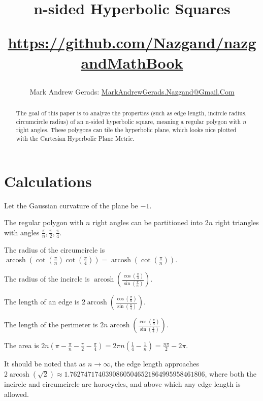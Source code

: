 \documentclass[]{article}
\author{Mark Andrew Gerads: \href{MailTo:MarkAndrewGerads.Nazgand@Gmail.Com}{MarkAndrewGerads.Nazgand@Gmail.Com}}
\title{
	n-sided Hyperbolic Squares
	
	\href{https://github.com/Nazgand/nazgandMathBook}{https://github.com/Nazgand/nazgandMathBook}
}
\DeclareMathOperator{\arcosh}{arcosh}
\newcommand{\pqty}[1]{{\left(#1\right)}}
\numberwithin{equation}{section}
\begin{document}
	
	\maketitle
	
	\begin{abstract}
		The goal of this paper is to analyze the properties (such as edge length, incircle radius, circumcircle radius) of an n-sided hyperbolic square, meaning a regular polygon with $n$ right angles. These polygons can tile the hyperbolic plane, which looks nice plotted with the Cartesian Hyperbolic Plane Metric.
	\end{abstract}
	
	\section{Calculations}
	Let the Gaussian curvature of the plane be $-1$.
	
	The regular polygon with $n$ right angles can be partitioned into $2n$ right triangles with angles $\frac{\pi}{n},\frac{\pi}{2},\frac{\pi}{4}$.
	
	The radius of the circumcircle is $\arcosh\pqty{\cot\pqty{\frac{\pi}{n}}\cot\pqty{\frac{\pi}{4}}}=\arcosh\pqty{\cot\pqty{\frac{\pi}{n}}}$.
	
	The radius of the incircle is
	$\arcosh\pqty{\frac{\cos\pqty{\frac{\pi}{4}}}{\sin\pqty{\frac{\pi}{n}}}}$.
	
	The length of an edge is
	$2\arcosh\pqty{\frac{\cos\pqty{\frac{\pi}{n}}}{\sin\pqty{\frac{\pi}{4}}}}$.
	
	The length of the perimeter is
	$2n\arcosh\pqty{\frac{\cos\pqty{\frac{\pi}{n}}}{\sin\pqty{\frac{\pi}{4}}}}$.
	
	The area is
	$2n\pqty{\pi-\frac{\pi}{n}-\frac{\pi}{2}-\frac{\pi}{4}}=
	2\pi n\pqty{\frac{1}{4}-\frac{1}{n}}=
	\frac{n\pi}{2}-2\pi$.
	
	It should be noted that as $n\to\infty$, the edge length approaches
	$2\arcosh\pqty{\sqrt{2}}\approx 1.76274717403908605046521864995958461806$, where both the incircle and circumcircle are horocycles, and above which any edge length is allowed.
	
\end{document}
